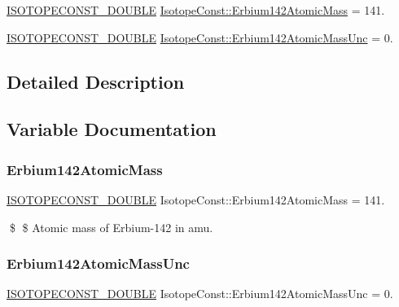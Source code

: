\begin{DoxyCompactItemize}
\item 
\mbox{\hyperlink{group___isotope_const-_macros_ga8f45a7272ce02c0b4c65c44636ed719a}{I\+S\+O\+T\+O\+P\+E\+C\+O\+N\+S\+T\+\_\+\+D\+O\+U\+B\+LE}} \mbox{\hyperlink{group___isotope_const-_erbium-_er142_ga604776ad064bd65379ba2aff5a9c9b60}{Isotope\+Const\+::\+Erbium142\+Atomic\+Mass}} = 141.
\item 
\mbox{\hyperlink{group___isotope_const-_macros_ga8f45a7272ce02c0b4c65c44636ed719a}{I\+S\+O\+T\+O\+P\+E\+C\+O\+N\+S\+T\+\_\+\+D\+O\+U\+B\+LE}} \mbox{\hyperlink{group___isotope_const-_erbium-_er142_ga6f392f44592e8e43361188fab84872ba}{Isotope\+Const\+::\+Erbium142\+Atomic\+Mass\+Unc}} = 0.
\end{DoxyCompactItemize}


\subsection{Detailed Description}


\subsection{Variable Documentation}
\mbox{\label{group___isotope_const-_erbium-_er142_ga604776ad064bd65379ba2aff5a9c9b60}} 
\subsubsection{\texorpdfstring{Erbium142\+Atomic\+Mass}{Erbium142AtomicMass}}
{\footnotesize\ttfamily \mbox{\hyperlink{group___isotope_const-_macros_ga8f45a7272ce02c0b4c65c44636ed719a}{I\+S\+O\+T\+O\+P\+E\+C\+O\+N\+S\+T\+\_\+\+D\+O\+U\+B\+LE}} Isotope\+Const\+::\+Erbium142\+Atomic\+Mass = 141.}

\$ \$ Atomic mass of Erbium-\/142 in amu. \mbox{\label{group___isotope_const-_erbium-_er142_ga6f392f44592e8e43361188fab84872ba}} 
\subsubsection{\texorpdfstring{Erbium142\+Atomic\+Mass\+Unc}{Erbium142AtomicMassUnc}}
{\footnotesize\ttfamily \mbox{\hyperlink{group___isotope_const-_macros_ga8f45a7272ce02c0b4c65c44636ed719a}{I\+S\+O\+T\+O\+P\+E\+C\+O\+N\+S\+T\+\_\+\+D\+O\+U\+B\+LE}} Isotope\+Const\+::\+Erbium142\+Atomic\+Mass\+Unc = 0.}

